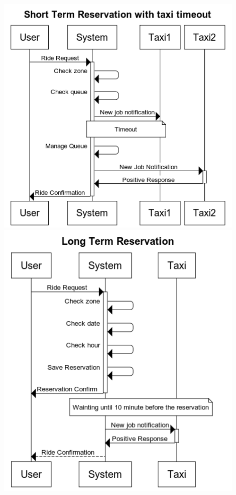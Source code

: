 \begin{center}
		\includegraphics[width=0.90\textwidth]{./images/Short_Term_Reservation_with_taxi_timeout}
		\includegraphics[width=0.90\textwidth]{./images/Long_Term_Reservation}
	\end{center}
